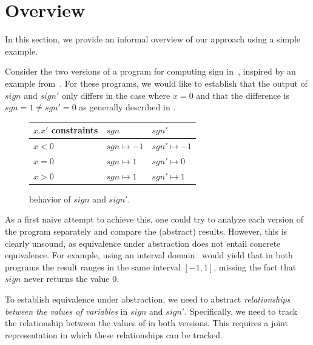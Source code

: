 \section{Overview}

In this section, we provide an informal overview of our approach using a simple example.



Consider the two versions of a program for computing sign in~, inspired by an example from~\cite{MauborgneRival07}. For these programs, we would like to establish that the output of $sign$ and $sign'$ only differs in the case where $x=0$ and that the difference is $sgn = 1 \neq sgn' = 0$ as generally described in .

\begin{figure}
\footnotesize
\centering
\begin{tabular}{l|l|l}
$x.x'$ constraints  & $sgn$             & $sgn'$
\\ \hline
$x < 0$             & $sgn \mapsto -1$  & $sgn' \mapsto -1$
\\ \hline
$x = 0$             & $sgn \mapsto 1$  & $sgn' \mapsto 0$
\\ \hline
$x > 0$             & $sgn \mapsto 1$  & $sgn' \mapsto 1$
\end{tabular}
\caption{behavior of $sign$ and $sign'$.}\label{Fi:SignSummary}
\end{figure}

As a first naive attempt to achieve this, one could try to analyze each version of the program separately and compare the (abstract) results. However, this is clearly unsound, as equivalence under abstraction does not entail concrete equivalence. For example, using an interval domain~\cite{CousotHalbwachs78} would yield that in both programs the result ranges in the same interval $[-1,1]$, missing the fact that $sign$ never returns the value $0$.


To establish equivalence under abstraction, we need to abstract \emph{relationships between the values of variables} in $sign$ and $sign'$. Specifically, we need to track the relationship between the values of  in both versions. This requires a joint representation in which these relationships can be tracked.


